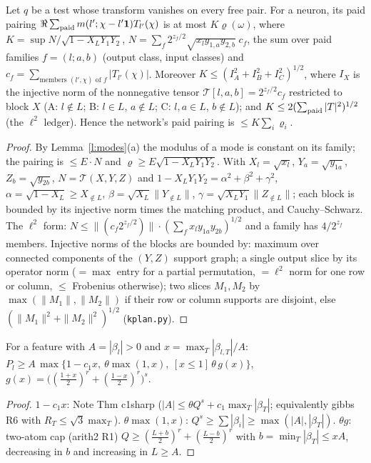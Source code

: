 \documentclass[11pt]{article}
\theoremstyle{remark}\newtheorem{remark}[theorem]{Remark}
\begin{document}
\begin{lemma}\label{l:K}
Let $q$ be a test whose transform vanishes on every free pair.  For a neuron, its paid pairing
$\Re\sum_{\rm paid}m(l';\chi-l'\mathbf 1)T_{l'}(\chi)$ is at most $K\varrho(\omega)$, where
$K=\sup N/\sqrt{1-X_LY_1Y_2}$, $N=\sum_{f}2^{z_f/2}\sqrt{x_{l}y_{1,a}y_{2,b}}\;c_f$, the sum over paid families $f=(l;a,b)$ (output class, input
classes) and $c_f=\sum_{\text{members }(l',\chi)\text{ of }f}|T_{l'}(\chi)|$.  Moreover $K\le(I_A^2+I_B^2+I_C^2)^{1/2}$, where $I_X$ is the injective
norm of the nonnegative tensor $\mathcal T[l,a,b]=2^{z_f/2}c_f$ restricted to block $X$ (A: $l\notin L$; B: $l\in L$, $a\notin L$; C: $l,a\in L$,
$b\notin L$); and $K\le2(\sum_{\rm paid}|T|^2)^{1/2}$ (the $\ell^2$ ledger).  Hence the network's paid pairing is $\le K\sum_i\varrho_i$.
\end{lemma}
\begin{proof}
By Lemma~\ref{l:modes}(a) the modulus of a mode is constant on its family; the pairing is $\le E\cdot N$ and
$\varrho\ge E\sqrt{1-X_LY_1Y_2}$.  With $X_l=\sqrt{x_l}$, $Y_a=\sqrt{y_{1a}}$, $Z_b=\sqrt{y_{2b}}$, $N=\mathcal T(X,Y,Z)$ and
$1-X_LY_1Y_2=\alpha^2+\beta^2+\gamma^2$, $\alpha=\sqrt{1-X_L}\ge X_{\notin L}$, $\beta=\sqrt{X_L}\|Y_{\notin L}\|$,
$\gamma=\sqrt{X_LY_1}\|Z_{\notin L}\|$; each block is bounded by its injective norm times the matching product, and Cauchy--Schwarz.
The $\ell^2$ form: $N\le\|(c_f2^{z_f/2})\|\cdot(\sum_fx_ly_{1a}y_{2b})^{1/2}$ and a family has $4/2^{z_f}$ members.
Injective norms of the blocks are bounded by: maximum over connected components of the $(Y,Z)$ support graph; a single output slice
by its operator norm ($=\max$ entry for a partial permutation, $=\ell^2$ norm for one row or column, $\le$ Frobenius otherwise); two
slices $M_1,M_2$ by $\max(\|M_1\|,\|M_2\|)$ if their row or column supports are disjoint, else $(\|M_1\|^2+\|M_2\|^2)^{1/2}$ (\texttt{kplan.py}).
\end{proof}

\begin{lemma}\label{l:pay}
For a feature with $A=|\beta_l|>0$ and $x=\max_T|\beta_{l,T}|/A$:
$P_l\ge A\,\max\{1-c_1x,\ \theta\max(1,x),\ [x\le1]\,\theta\,g(x)\}$, $g(x)=\big((\frac{1+x}2)^r+(\frac{1-x}2)^r\big)^s$.
\end{lemma}
\begin{proof}
$1-c_1x$: Note Thm c1sharp ($|A|\le\theta Q^s+c_1\max_T|\beta_T|$; equivalently gibbs R6 with $R_T\le\sqrt3\max_T$).
$\theta\max(1,x)$: $Q^s\ge\sum|\beta_i|\ge\max(|A|,|\beta_T|)$.  $\theta g$: two-atom cap (arith2 R1) $Q\ge(\frac{L+b}2)^r+(\frac{L-b}2)^r$ with
$b=\min_T|\beta_T|\le xA$, decreasing in $b$ and increasing in $L\ge A$.
\end{proof}
\end{document}

